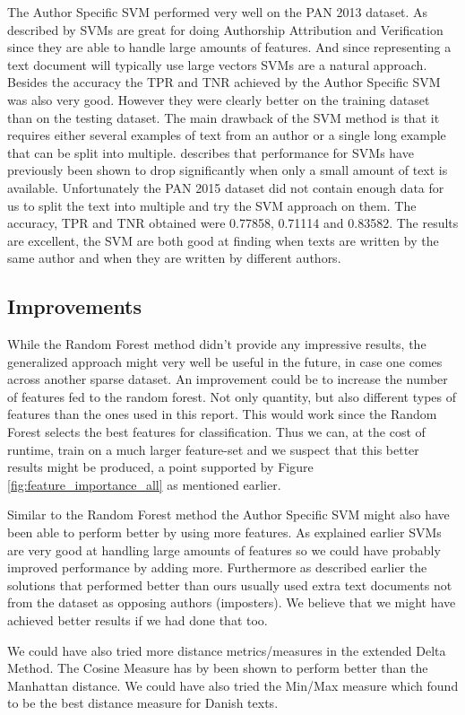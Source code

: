 The Author Specific SVM performed very well on the PAN 2013 dataset. As
described by \cite{stamatos2009} \gls{SVM}s are great for doing Authorship
Attribution and Verification since they are able to handle large amounts of
features. And since representing a text document will typically use large
vectors \gls{SVM}s are a natural approach. Besides the accuracy the \gls{TPR}
and \gls{TNR} achieved by the Author Specific SVM was also very good. However
they were clearly better on the training dataset than on the testing dataset.
The main drawback of the SVM method is that it requires either several examples
of text from an author or a single long example that can be split into multiple.
\cite{stamatos2009} describes that performance for \gls{SVM}s have previously
been shown to drop significantly when only a small amount of text is available.
Unfortunately the PAN 2015 dataset did not contain enough data for us to split
the text into multiple and try the SVM approach on them. The accuracy, \gls{TPR}
and \gls{TNR} obtained were 0.77858, 0.71114 and 0.83582. The results are
excellent, the \gls{SVM} are both good at finding when texts are written by the
same author and when they are written by different authors.

\subsection{Improvements}

While the Random Forest method didn't provide any impressive results, the
generalized approach might very well be useful in the future, in case one
comes across another sparse dataset. An improvement could be to increase the
number of features fed to the random forest. Not only quantity, but also
different types of features than the ones used in this report. This would work
since the Random Forest selects the best features for classification. Thus
we can, at the cost of runtime, train on a much larger feature-set and we
suspect that this better results might be produced, a point supported by Figure
\ref{fig:feature_importance_all} as mentioned earlier.

Similar to the Random Forest method the Author Specific SVM might also have been
able to perform better by using more features. As explained earlier \gls{SVM}s
are very good at handling large amounts of features so we could have probably
improved performance by adding more. Furthermore as described earlier the
solutions that performed better than ours usually used extra text documents not
from the dataset as opposing authors (imposters). We believe that we might have
achieved better results if we had done that too.

We could have also tried more distance metrics/measures in the extended Delta
Method. The Cosine Measure has by \cite{evert2015towards} been shown to perform
better than the Manhattan distance. We could have also tried the Min/Max measure
which \cite{aalykke2016} found to be the best distance measure for Danish
texts.
